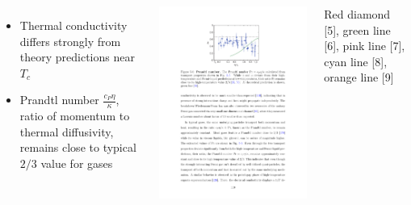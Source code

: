 \documentclass[26pt, paperwidth=36in,paperheight=48in]{tikzposter} %
\newcommand{\mysmallerfont}{\fontsize{20}{30}\selectfont}
\begin{document}
\begin{columns}
{\begin{minipage}{0.16\textwidth}
\begin{itemize}
			\item Thermal conductivity differs strongly from theory predictions near $T_c$
			
			\item Prandtl number $\frac{c_P \eta}{\kappa}$, ratio of momentum to thermal diffusivity, remains close to typical $2/3$ value for gases 
		\end{itemize}
		
	\end{minipage}
	\hspace{0.25cm}
	\begin{minipage}{0.22\textwidth}
		\includegraphics[width=\textwidth,
		trim=7cm 19cm 7cm 2cm, clip]{figures/prandtl.pdf}
	\end{minipage}

	\vspace{-0.36cm}
	\begin{center}
		\begin{minipage}{0.4\textwidth}
			\mysmallerfont
			\centering 
			Red diamond [5], green line [6], pink line [7], cyan line [8], orange line [9] 
		\end{minipage}
	\end{center}
	
}
\end{columns}
\end{document}
